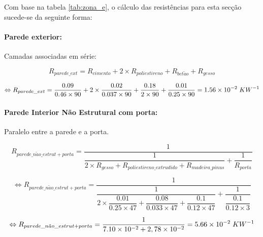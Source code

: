 \documentclass[12pt, a4paper]{article}
\begin{document}
Com base na tabela \ref*{tab:zona_e}, o cálculo das resistências para esta secção sucede-se da seguinte forma:

\paragraph{Parede exterior:}\label{par:zona_e_ext}Camadas associadas em série:

\begin{equation}
	R_{parede\_ext} = R_{cimento} + 2 \times R_{poliestireno} + R_{bet\tilde{a}o} + R_{gesso}
	\label{eq:zona_e_ext_1}
\end{equation}

\begin{equation}
	\Leftrightarrow R_{parede\_ext} =
	\dfrac{0.09}{0.46 \times 90} +
	2 \times \dfrac{0.02}{0.037 \times 90} +
	\dfrac{0.18}{2 \times 90} +
	\dfrac{0.01}{0.25 \times 90} = 1.56 \times 10^{-2} \hspace{1mm} KW^{-1}
	\label{eq:zona_e_ext_2}
\end{equation}

\paragraph{Parede Interior N\~ao Estrutural com porta:}\label{par:zona_e_int_n_est}Paralelo entre a parede e a porta.

\begin{equation}
    R_{parede\_n\tilde{a}o\_estrut + porta} =
        \dfrac{1}{
			\dfrac{1}{
            2 \times R_{gesso} + R_{poliestireno\_extrudido} + R_{madeira\_pinus}
			}
			+
			\dfrac{1}{
				R_{porta}
			}
		}
    \label{eq:zona_e_int_n_est_1}
\end{equation}

\begin{equation}
    \Leftrightarrow R_{parede\_n\tilde{a}o\_estrut + porta} =
        \dfrac{1}{
			\dfrac{1}{
            2 \times \dfrac{0.01}{0.25 \times 47} +
            \dfrac{0.08}{0.033 \times 47} +
            \dfrac{0.1}{0.12 \times 47}
        	}
			+
			\dfrac{1}{
            \dfrac{0.1}{0.12 \times 3}
			}
		}
    \label{eq:zona_e_int_n_est_2}
\end{equation}

\begin{equation}
    \Leftrightarrow R_{parede\_n\tilde{a}o\_estrut + porta} =
	\dfrac{1}{
        7.10 \times 10^{-2} + 2,78 \times 10^{-2}
	}
	= 5.66 \times 10^{-2} \hspace{1mm} KW^{-1}
    \label{eq:zona_e_int_n_est_3}
\end{equation}
\end{document}
